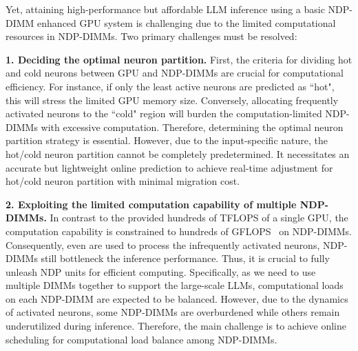 Yet, attaining high-performance but affordable LLM inference using a basic NDP-DIMM enhanced GPU system is challenging due to the limited computational resources in NDP-DIMMs. Two primary challenges must be resolved:


\textbf{1. Deciding the optimal neuron partition. }
First, the criteria for dividing hot and cold neurons between GPU and NDP-DIMMs are crucial for computational efficiency. For instance, if only the least active neurons are predicted as ``hot", this will stress the limited GPU memory size. Conversely, allocating frequently activated neurons to the ``cold" region will burden the computation-limited NDP-DIMMs with excessive computation. Therefore, determining the optimal neuron partition strategy is essential. However, due to the input-specific nature, the hot/cold neuron partition cannot be completely predetermined. It necessitates an accurate but lightweight online prediction to achieve real-time adjustment for hot/cold neuron partition with minimal migration cost. 


\textbf{2. Exploiting the limited computation capability of multiple NDP-DIMMs. }
In contrast to the provided hundreds of TFLOPS of a single GPU, the computation capability is constrained to hundreds of GFLOPS~\cite{asghari2016chameleon,zhou2023dimm,devaux2019true,kim2021aquabolt} on NDP-DIMMs. Consequently, even are used to process the infrequently activated neurons, NDP-DIMMs still bottleneck the inference performance. Thus, it is crucial to fully unleash NDP units for efficient computing. Specifically, as we need to use multiple DIMMs together to support the large-scale LLMs, computational loads on each NDP-DIMM are expected to be balanced. However, due to the dynamics of activated neurons, some NDP-DIMMs are overburdened while others remain underutilized during inference. Therefore, the main challenge is to achieve online scheduling for computational load balance among NDP-DIMMs.


